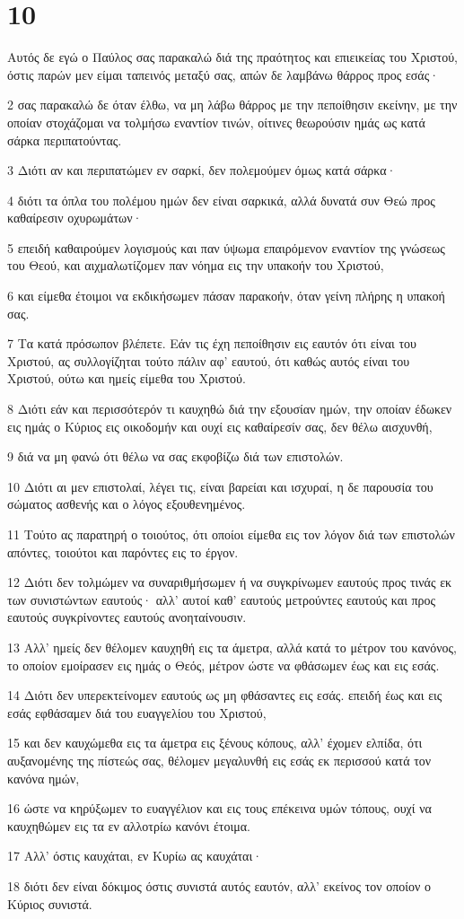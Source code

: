 \chapter{10}

\par Αυτός δε εγώ ο Παύλος σας παρακαλώ διά της πραότητος και επιεικείας του Χριστού, όστις παρών μεν είμαι ταπεινός μεταξύ σας, απών δε λαμβάνω θάρρος προς εσάς·
\par 2 σας παρακαλώ δε όταν έλθω, να μη λάβω θάρρος με την πεποίθησιν εκείνην, με την οποίαν στοχάζομαι να τολμήσω εναντίον τινών, οίτινες θεωρούσιν ημάς ως κατά σάρκα περιπατούντας.
\par 3 Διότι αν και περιπατώμεν εν σαρκί, δεν πολεμούμεν όμως κατά σάρκα·
\par 4 διότι τα όπλα του πολέμου ημών δεν είναι σαρκικά, αλλά δυνατά συν Θεώ προς καθαίρεσιν οχυρωμάτων·
\par 5 επειδή καθαιρούμεν λογισμούς και παν ύψωμα επαιρόμενον εναντίον της γνώσεως του Θεού, και αιχμαλωτίζομεν παν νόημα εις την υπακοήν του Χριστού,
\par 6 και είμεθα έτοιμοι να εκδικήσωμεν πάσαν παρακοήν, όταν γείνη πλήρης η υπακοή σας.
\par 7 Τα κατά πρόσωπον βλέπετε. Εάν τις έχη πεποίθησιν εις εαυτόν ότι είναι του Χριστού, ας συλλογίζηται τούτο πάλιν αφ' εαυτού, ότι καθώς αυτός είναι του Χριστού, ούτω και ημείς είμεθα του Χριστού.
\par 8 Διότι εάν και περισσότερόν τι καυχηθώ διά την εξουσίαν ημών, την οποίαν έδωκεν εις ημάς ο Κύριος εις οικοδομήν και ουχί εις καθαίρεσίν σας, δεν θέλω αισχυνθή,
\par 9 διά να μη φανώ ότι θέλω να σας εκφοβίζω διά των επιστολών.
\par 10 Διότι αι μεν επιστολαί, λέγει τις, είναι βαρείαι και ισχυραί, η δε παρουσία του σώματος ασθενής και ο λόγος εξουθενημένος.
\par 11 Τούτο ας παρατηρή ο τοιούτος, ότι οποίοι είμεθα εις τον λόγον διά των επιστολών απόντες, τοιούτοι και παρόντες εις το έργον.
\par 12 Διότι δεν τολμώμεν να συναριθμήσωμεν ή να συγκρίνωμεν εαυτούς προς τινάς εκ των συνιστώντων εαυτούς· αλλ' αυτοί καθ' εαυτούς μετρούντες εαυτούς και προς εαυτούς συγκρίνοντες εαυτούς ανοηταίνουσιν.
\par 13 Αλλ' ημείς δεν θέλομεν καυχηθή εις τα άμετρα, αλλά κατά το μέτρον του κανόνος, το οποίον εμοίρασεν εις ημάς ο Θεός, μέτρον ώστε να φθάσωμεν έως και εις εσάς.
\par 14 Διότι δεν υπερεκτείνομεν εαυτούς ως μη φθάσαντες εις εσάς. επειδή έως και εις εσάς εφθάσαμεν διά του ευαγγελίου του Χριστού,
\par 15 και δεν καυχώμεθα εις τα άμετρα εις ξένους κόπους, αλλ' έχομεν ελπίδα, ότι αυξανομένης της πίστεώς σας, θέλομεν μεγαλυνθή εις εσάς εκ περισσού κατά τον κανόνα ημών,
\par 16 ώστε να κηρύξωμεν το ευαγγέλιον και εις τους επέκεινα υμών τόπους, ουχί να καυχηθώμεν εις τα εν αλλοτρίω κανόνι έτοιμα.
\par 17 Αλλ' όστις καυχάται, εν Κυρίω ας καυχάται·
\par 18 διότι δεν είναι δόκιμος όστις συνιστά αυτός εαυτόν, αλλ' εκείνος τον οποίον ο Κύριος συνιστά.


